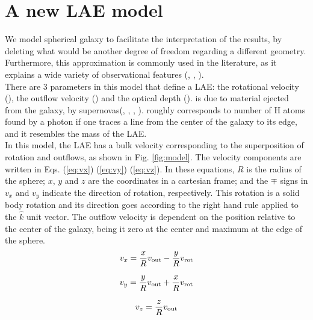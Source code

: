 \documentclass[twocolappendix]{latex/emulateapj}
\begin{document}
 

\section{A new LAE model}
\label{sec:newmodel}

We model spherical galaxy to facilitate the interpretation of the results, by deleting what would be another degree of freedom regarding a different geometry. Furthermore, this approximation is commonly used in the literature, as it explains a wide variety of observational features (\cite{Ahn03}, \cite{Verhamme06}, \cite{Dijkstra06}). \\

There are 3 parameters in this model that define a LAE: the rotational velocity (\vrot), the outflow velocity (\vout) and the optical depth (\tauh). \vout is due to material ejected from the galaxy, by supernovas(\cite{Verhamme06}, \cite{Orsi12}, \cite{Hashimoto2015}, \cite{Gronke2015}). \tauh roughly corresponds to number of H atoms found by a \lya photon if one traces a line from the center of the galaxy to its edge, and it resembles the mass of the LAE.\\

In this model, the LAE has a bulk velocity corresponding to the superposition of rotation and outflows, as shown in Fig. \ref{fig:model}. The velocity components are written in Eqs. (\ref{eq:vx}) (\ref{eq:vy}) (\ref{eq:vz}). In these equations, $R$ is the radius of the sphere; $x$, $y$ and $z$ are the coordinates in a cartesian frame; and the $\mp$ signs in $v_x$ and $v_y$ indicate the direction of rotation, respectively. This rotation is a solid body rotation and its direction goes according to the right hand rule applied to the $\hat{k}$ unit vector. The outflow velocity is dependent on the position relative to the center of the galaxy, being it zero at the center and maximum at the edge of the sphere.\\

\begin{equation}
	v_{x}=\frac{x}{R}v_{\rm out}-\frac{y}{R}v_{\rm rot} 
	\label{eq:vx}
\end{equation}

\begin{equation}
	v_{y}=\frac{y}{R}v_{\rm out}+\frac{x}{R}v_{\rm rot} 
	\label{eq:vy}
\end{equation}

\begin{equation}
	v_{z}=\frac{z}{R}v_{\rm out}
	\label{eq:vz}
\end{equation}
\end{document}
